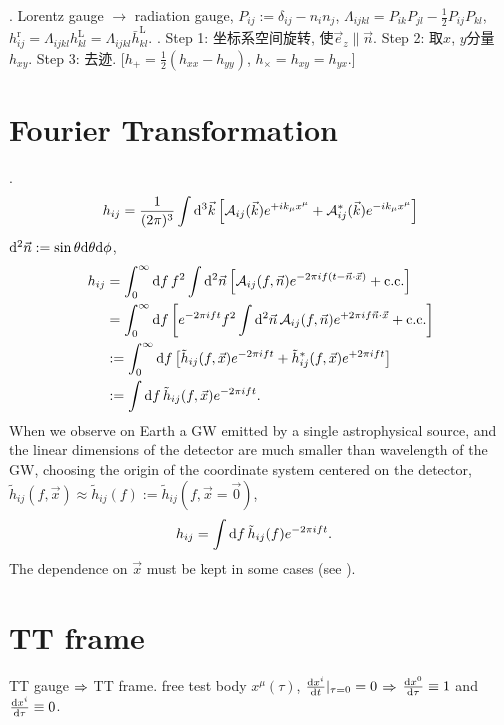 \cite{Maggiore2014}. Lorentz gauge $\to$ radiation gauge, $P_{ij}:=\delta_{ij}-n_in_j$, $\Lambda_{ijkl}=P_{ik}P_{jl}-\frac{1}{2}P_{ij}P_{kl}$, $h_{ij}^\text{r}=\Lambda_{ijkl}h_{kl}^\text{L}=\Lambda_{ijkl}\bar{h}_{kl}^\text{L}$. \cite{Sathyaprakash2009}. Step 1: 坐标系空间旋转, 使$\vec{e}_z\parallel\vec{n}$. Step 2: 取$x$, $y$分量$h_{xy}$. Step 3: 去迹. [$h_+=\frac{1}{2}(h_{xx}-h_{yy})$, $h_\times=h_{xy}=h_{yx}$.]

\section{Fourier Transformation}

\def\A{\mathcal{A}}
\cite{Maggiore2014}. 
\begin{equation}
    h_{ij}=\frac{1}{(2\pi)^3}\int\d^3\vec{k}\left[\A_{ij}(\vec{k})e^{+ik_\mu x^\mu}+\A_{ij}^*(\vec{k})e^{-ik_\mu x^\mu}\right]
\end{equation}
$\mathrm{d}^2\vec{n}:=\sin\theta\mathrm{d}\theta\mathrm{d}\phi$,
\begin{align}
    h_{ij}&=\int_0^\infty\d f\, f^2\int\d^2\vec{n}\left[\A_{ij}(f,\vec{n})e^{-2\pi i f(t-\vec{n}\cdot\vec{x})}+\text{c.c.}\right]\\
    &=\int_0^\infty\d f\left[e^{-2\pi i ft}f^2\int\d^2\vec{n}\,\A_{ij}(f,\vec{n})e^{+2\pi i f\vec{n}\cdot\vec{x}}+\text{c.c.}\right]\\
    &:=\int_0^\infty\d f\left[\tilde{h}_{ij}(f,\vec{x})e^{-2\pi i ft}+\tilde{h}_{ij}^*(f,\vec{x})e^{+2\pi i ft}\right]\\
    &:=\int\d f\,\tilde{h}_{ij}(f,\vec{x})e^{-2\pi i ft}.
\end{align}
When we observe on Earth a GW emitted by a single astrophysical source, and the linear dimensions of the detector are much smaller than wavelength of the GW, choosing the origin of the coordinate system centered on the detector, $\tilde{h}_{ij}(f,\vec{x})\approx\tilde{h}_{ij}(f):=\tilde{h}_{ij}(f,\vec{x}=\vec{0})$,
\begin{align}
    h_{ij}&=\int\mathrm{d} f\,\tilde{h}_{ij}(f)e^{-2\pi i ft}.
\end{align}
The dependence on $\vec{x}$ must be kept in some cases (see \cite{Maggiore2014}).

\section{TT frame}

TT gauge $\Rightarrow$ TT frame. free test body $x^\mu(\tau)$, $\frac{\mathrm{d} x^i}{\mathrm{d} t}|_{\tau=0}=0$ $\Rightarrow$ $\frac{\mathrm{d} x^0}{\mathrm{d} \tau}\equiv1$ and $\frac{\mathrm{d} x^i}{\mathrm{d} \tau}\equiv0$.

